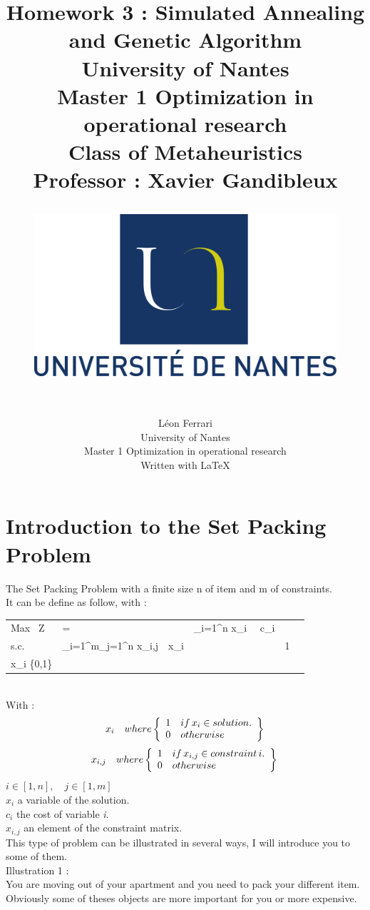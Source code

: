 \documentclass[12pt]{article}
\title{%
		Homework 3 : Simulated Annealing and Genetic Algorithm \\
		\large University of Nantes \\
		Master 1 Optimization in operational research  \\
		Class of Metaheuristics \\
		Professor : Xavier Gandibleux	\\
		\vspace{4cm}
		\begin{figure}[h]
			\centering
			\includegraphics[scale=0.20]{logo-un.png}
		\end{figure} 
	}
\author{
 \vspace{4cm}\\
	L\'eon Ferrari\\
	\small University of Nantes \\
	\small Master 1 Optimization in operational research\\
	Written with \LaTeX
 }
\begin{document}
	\maketitle
	\pagebreak
	\tableofcontents{}
	\pagebreak
	\section{Introduction to the Set Packing Problem}
	The Set Packing Problem with a finite size n of item and m of constraints.\\
	It can be define as follow, with :\\
	
	\begin{tabular}{LLLLL}
		Max \, Z & = &  \sum\limits_{i=1}^n x_{i} \, \times \, c_{i}  \\ 
		s.c. & \sum\limits_{i=1}^m\sum\limits_{j=1}^n x_{i,j}\, \times \, x_i & \leq &  1 \\
		x_{i} \in \{0,1\} \\
	\end{tabular}\\
	With : \\
	$$ x_i \quad where \left\{\begin{array}{ll}
	1 \quad if \, x_i \in solution. \\
	0 \quad otherwise\\
	\end{array}  \right\} \\$$ $$
	x_{i,j} \quad where \left\{\begin{array}{ll}
	1 \quad if \, x_{i,j} \in constraint \,i. \\
	0 \quad otherwise\\
	\end{array}  \right\} \\$$
	$ i \in [1,n], \quad j \in [1,m]$\\
	$x_i$ a variable of the solution.\\
	$c_i$ the cost of variable \textit{i}.\\
	$x_{i,j} $ an element of the constraint matrix.\\
	This type of problem can be illustrated in several ways, I will introduce you to some of them.
	\vspace{15pt} \\
	Illustration 1 :\\
	You are moving out of your apartment and you need to pack your different item.\\
	Obviously some of theses objects are more important for you or more expensive.\\
\end{document}
